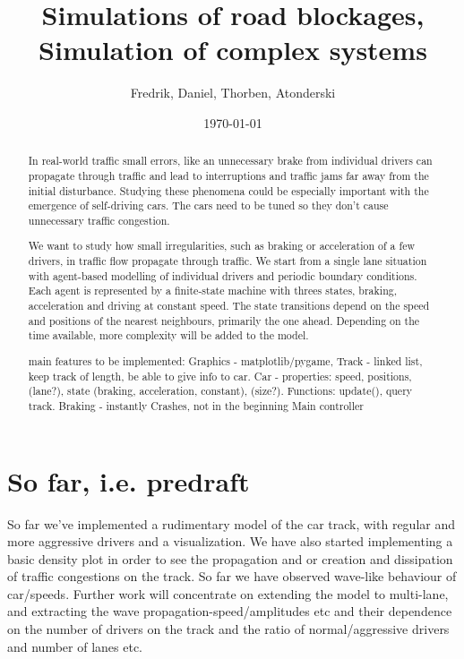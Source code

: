 \documentclass[11pt,a4paper,twocolumn]{article}
\begin{document}
\title{Simulations of road blockages, Simulation of complex systems}
\author{Fredrik, Daniel, Thorben, Atonderski}
\date{\today}
\maketitle


\begin{abstract}
  In real-world traffic small errors, like an unnecessary brake from individual drivers can propagate through traffic and lead to interruptions and traffic jams far away from the initial disturbance. Studying these phenomena could be especially important with the emergence of self-driving cars. The cars need to be tuned so they don't cause unnecessary traffic congestion.

We want to study how small irregularities, such as braking or acceleration of a few drivers, in traffic flow propagate through traffic. We start from a single lane situation with agent-based modelling of individual drivers and periodic boundary conditions. Each agent is represented by a finite-state machine with threes states, braking, acceleration and driving at constant speed. The state transitions depend on the speed and positions of the nearest neighbours, primarily the one ahead. Depending on the time available, more complexity will be added to the model.  

main features to be implemented:
Graphics - matplotlib/pygame,
Track - linked list, keep track of length, be able to give info to car.
Car - properties: speed, positions, (lane?), state (braking, acceleration, constant), (size?). Functions: update(), query track.
Braking - instantly
Crashes, not in the beginning
Main controller


\end{abstract}

\newpage
\tableofcontents

\section{So far, i.e. predraft}
So far we've implemented a rudimentary model of the car track, with regular and more aggressive drivers and a visualization. We have also started implementing a basic density plot in order to see the propagation and or creation and dissipation of traffic congestions on the track. So far we have observed wave-like behaviour of car/speeds. Further work will concentrate on extending the model to multi-lane, and extracting the wave propagation-speed/amplitudes etc and their dependence on the number of drivers on the track and the ratio of normal/aggressive drivers and number of lanes etc.
\end{document}
